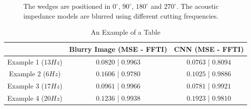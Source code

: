 \documentclass[conference]{IEEEtran}
\begin{document}
\begin{figure}[!t]
\caption{The wedges are positioned in $0^{\circ}$, $90^{\circ}$, $180^{\circ}$ and $270^{\circ}$. The acoustic impedance models are blurred using different cutting frequencies.}
\label{fig_scenario5}
\end{figure}

\begin{table}[!t]
\renewcommand{\arraystretch}{1.2}
\caption{An Example of a Table}
\label{table_caso_5}
\centering
\begin{tabular}{|c||c||c|}
\hline
  & Blurry Image (MSE - FFTI) & CNN (MSE - FFTI)\\
\hline
Example 1 ($13Hz$) & $0.0820$ | $0.9963$ & $0.0763$ | $0.8094$\\
\hline
Example 2 ($6Hz$)& $0.1606$ | $0.9780$ & $0.1025$ | $0.9886$\\
\hline
Example 3 ($17Hz$)& $0.0961$ | $0.9966$ & $0.0781$ | $0.9921$\\
\hline
Example 4 ($20Hz$)& $0.1236$ | $0.9938$ & $0.1923$ | $0.9810$\\
\hline
\end{tabular}
\end{table}
\end{document}
